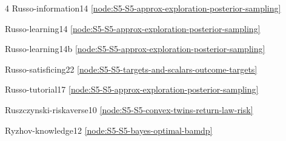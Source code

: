 \documentclass[10pt]{article}
\begin{document}
{\begin{multicols}{4}
Russo-information14 \hfill \ref{node:S5-S5-approx-exploration-posterior-sampling}\par
Russo-learning14 \hfill \ref{node:S5-S5-approx-exploration-posterior-sampling}\par
Russo-learning14b \hfill \ref{node:S5-S5-approx-exploration-posterior-sampling}\par
Russo-satisficing22 \hfill \ref{node:S5-S5-targets-and-scalars-outcome-targets}\par
Russo-tutorial17 \hfill \ref{node:S5-S5-approx-exploration-posterior-sampling}\par
Ruszczynski-riskaverse10 \hfill \ref{node:S5-S5-convex-twins-return-law-risk}\par
Ryzhov-knowledge12 \hfill \ref{node:S5-S5-bayes-optimal-bamdp}\par


\end{multicols}}
\end{document}
